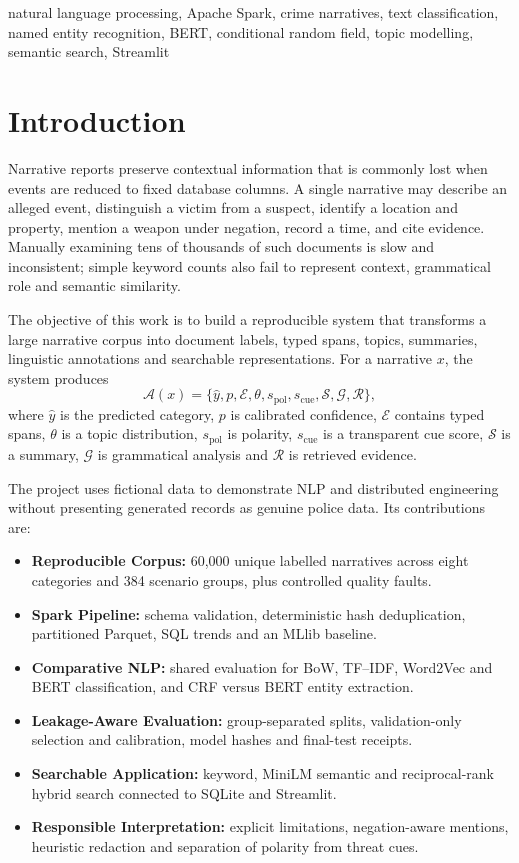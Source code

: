 \documentclass[conference]{IEEEtran}
\begin{document}
\begin{IEEEkeywords}
natural language processing, Apache Spark, crime narratives, text classification, named entity recognition, BERT, conditional random field, topic modelling, semantic search, Streamlit
\end{IEEEkeywords}

\section{Introduction}

Narrative reports preserve contextual information that is commonly lost when events are reduced to fixed database columns. A single narrative may describe an alleged event, distinguish a victim from a suspect, identify a location and property, mention a weapon under negation, record a time, and cite evidence. Manually examining tens of thousands of such documents is slow and inconsistent; simple keyword counts also fail to represent context, grammatical role and semantic similarity.

The objective of this work is to build a reproducible system that transforms a large narrative corpus into document labels, typed spans, topics, summaries, linguistic annotations and searchable representations. For a narrative $x$, the system produces
\begin{equation}
\mathcal{A}(x)=
\{\hat{y},p,\mathcal{E},\theta,s_{\mathrm{pol}},s_{\mathrm{cue}},
\mathcal{S},\mathcal{G},\mathcal{R}\},
\end{equation}
where $\hat{y}$ is the predicted category, $p$ is calibrated confidence, $\mathcal{E}$ contains typed spans, $\theta$ is a topic distribution, $s_{\mathrm{pol}}$ is polarity, $s_{\mathrm{cue}}$ is a transparent cue score, $\mathcal{S}$ is a summary, $\mathcal{G}$ is grammatical analysis and $\mathcal{R}$ is retrieved evidence.

The project uses fictional data to demonstrate NLP and distributed engineering without presenting generated records as genuine police data. Its contributions are:
\begin{itemize}
\item \textbf{Reproducible Corpus:} 60,000 unique labelled narratives across eight categories and 384 scenario groups, plus controlled quality faults.
\item \textbf{Spark Pipeline:} schema validation, deterministic hash deduplication, partitioned Parquet, SQL trends and an MLlib baseline.
\item \textbf{Comparative NLP:} shared evaluation for BoW, TF--IDF, Word2Vec and BERT classification, and CRF versus BERT entity extraction.
\item \textbf{Leakage-Aware Evaluation:} group-separated splits, validation-only selection and calibration, model hashes and final-test receipts.
\item \textbf{Searchable Application:} keyword, MiniLM semantic and reciprocal-rank hybrid search connected to SQLite and Streamlit.
\item \textbf{Responsible Interpretation:} explicit limitations, negation-aware mentions, heuristic redaction and separation of polarity from threat cues.
\end{itemize}
\end{document}
